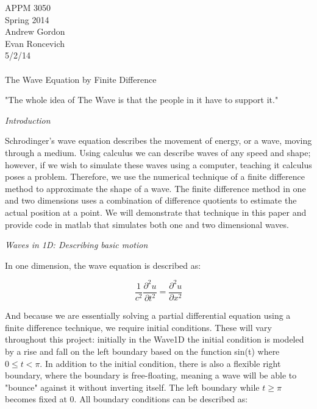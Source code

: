 \documentclass[12pt]{article}
\begin{document}
APPM 3050\\
Spring 2014\\
Andrew Gordon \\
Evan Roncevich\\
5/2/14\\

\hrulefill

\paragraph{}
\centerline{\huge{The Wave Equation by Finite Difference}}

\centerline{"The whole idea of The Wave is that the people in it have to support it."}
\newpage

\begin{enumerate}

\large{\item\textit{Introduction}}

\normalsize{Schrodinger's wave equation describes the movement of energy, or a wave, moving through a medium.  Using calculus we can describe waves of any speed and shape; however, if we wish to simulate these waves using a computer, teaching it calculus poses a problem. Therefore, we use the numerical technique of a finite difference method to approximate the shape of a wave. The finite difference method in one and two dimensions uses a combination of difference quotients to estimate the actual position at a point.  We will demonstrate that technique in this paper and provide code in matlab that simulates both one and two dimensional waves.}

\large{\item\textit{Waves in 1D: Describing basic motion}

\normalsize{In one dimension, the wave equation is described as:}

\[ \frac{1}{c^2} \frac{\partial^2 u}{\partial t^2} = \frac{\partial^2 u}{\partial x^2} \]

\normalsize{And because we are essentially solving a partial differential equation using a finite difference technique, we require initial conditions. These will vary throughout this project: initially in the Wave1D the initial condition is modeled by a rise and fall on the left boundary based on the function sin(t) where $0\le t <\pi$. In addition to the initial condition, there is also a flexible right boundary, where the boundary is free-floating, meaning a wave will be able to "bounce" against it without inverting itself. The left boundary while $t\ge\pi$ becomes fixed at 0. All boundary conditions can be described as:}


}
\end{enumerate}
\end{document}
